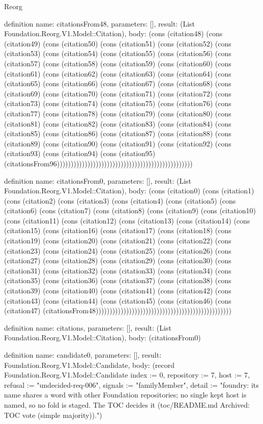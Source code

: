 \begin{lexlean}{Reorg}
\begin{semanticmodule}
definition{
  name: citationsFrom48,
  parameters: [],
  result: (List Foundation.Reorg.V1.Model::Citation),
  body: (cons (citation48) (cons (citation49) (cons (citation50) (cons (citation51) (cons (citation52) (cons (citation53) (cons (citation54) (cons (citation55) (cons (citation56) (cons (citation57) (cons (citation58) (cons (citation59) (cons (citation60) (cons (citation61) (cons (citation62) (cons (citation63) (cons (citation64) (cons (citation65) (cons (citation66) (cons (citation67) (cons (citation68) (cons (citation69) (cons (citation70) (cons (citation71) (cons (citation72) (cons (citation73) (cons (citation74) (cons (citation75) (cons (citation76) (cons (citation77) (cons (citation78) (cons (citation79) (cons (citation80) (cons (citation81) (cons (citation82) (cons (citation83) (cons (citation84) (cons (citation85) (cons (citation86) (cons (citation87) (cons (citation88) (cons (citation89) (cons (citation90) (cons (citation91) (cons (citation92) (cons (citation93) (cons (citation94) (cons (citation95) (citationsFrom96)))))))))))))))))))))))))))))))))))))))))))))))))
}

definition{
  name: citationsFrom0,
  parameters: [],
  result: (List Foundation.Reorg.V1.Model::Citation),
  body: (cons (citation0) (cons (citation1) (cons (citation2) (cons (citation3) (cons (citation4) (cons (citation5) (cons (citation6) (cons (citation7) (cons (citation8) (cons (citation9) (cons (citation10) (cons (citation11) (cons (citation12) (cons (citation13) (cons (citation14) (cons (citation15) (cons (citation16) (cons (citation17) (cons (citation18) (cons (citation19) (cons (citation20) (cons (citation21) (cons (citation22) (cons (citation23) (cons (citation24) (cons (citation25) (cons (citation26) (cons (citation27) (cons (citation28) (cons (citation29) (cons (citation30) (cons (citation31) (cons (citation32) (cons (citation33) (cons (citation34) (cons (citation35) (cons (citation36) (cons (citation37) (cons (citation38) (cons (citation39) (cons (citation40) (cons (citation41) (cons (citation42) (cons (citation43) (cons (citation44) (cons (citation45) (cons (citation46) (cons (citation47) (citationsFrom48)))))))))))))))))))))))))))))))))))))))))))))))))
}

definition{
  name: citations,
  parameters: [],
  result: (List Foundation.Reorg.V1.Model::Citation),
  body: (citationsFrom0)
}

definition{
  name: candidate0,
  parameters: [],
  result: Foundation.Reorg.V1.Model::Candidate,
  body: (record Foundation.Reorg.V1.Model::Candidate {index := 0, repository := 7, host := 7, refusal := "undecided-req-006", signals := "familyMember", detail := "foundry: its name shares a word with other Foundation repositories; no single kept host is named, so no fold is staged. The TOC decides it (toc/README.md Archived: TOC vote (simple majority))."})
}


\end{semanticmodule}
\end{lexlean}
